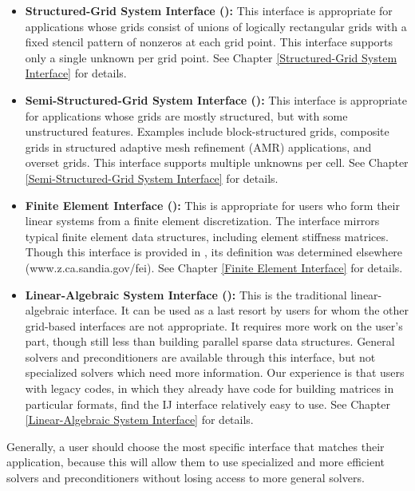 \begin{itemize}

\item
{\bf Structured-Grid System Interface ():} This interface
is appropriate for applications whose grids consist of unions of
logically rectangular grids with a fixed stencil pattern of nonzeros
at each grid point.  This interface supports only a single unknown per
grid point.
See Chapter \ref{Structured-Grid System Interface} for details.

\item
{\bf Semi-Structured-Grid System Interface ():} This
interface is appropriate for applications whose grids are mostly
structured, but with some unstructured features.  Examples include
block-structured grids, composite grids in structured adaptive mesh
refinement (AMR) applications, and overset grids.  This interface
supports multiple unknowns per cell.
See Chapter \ref{Semi-Structured-Grid System Interface} for details.

\item
{\bf Finite Element Interface ():} This is appropriate for
users who form their linear systems from a finite element
discretization.  The interface mirrors typical finite element data
structures, including element stiffness matrices.  Though this
interface is provided in \hypre{}, its definition was determined
elsewhere (www.z.ca.sandia.gov/fei).
See Chapter \ref{Finite Element Interface} for details.

\item
{\bf Linear-Algebraic System Interface ():} This is the
traditional linear-algebraic interface.  It can be used as a last
resort by users for whom the other grid-based interfaces are not
appropriate.  It requires more work on the user's part, though still
less than building parallel sparse data structures.  General solvers
and preconditioners are available through this interface, but not
specialized solvers which need more information.  Our experience is
that users with legacy codes, in which they already have code for
building matrices in particular formats, find the IJ interface
relatively easy to use.
See Chapter \ref{Linear-Algebraic System Interface} for details.

\end{itemize}

Generally, a user should choose the most specific interface that
matches their application, because this will allow them to use
specialized and more efficient solvers and preconditioners without
losing access to more general solvers.

